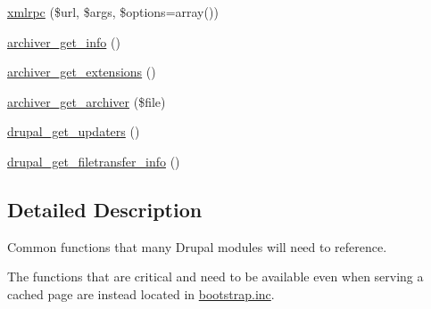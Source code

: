 \begin{DoxyCompactItemize}
\hyperlink{common_8inc_a66953a56d54712147cc383c1adb08dc3}{xmlrpc} (\$url, \$args, \$options=array())
\item 
\hyperlink{common_8inc_a15bb26df893f7c8919ab8e4505085028}{archiver\_\-get\_\-info} ()
\item 
\hyperlink{common_8inc_a18a577f5ca64b7ba483fc312e15d4d30}{archiver\_\-get\_\-extensions} ()
\item 
\hyperlink{common_8inc_af2f29710c2fe37e69be6501bf833361b}{archiver\_\-get\_\-archiver} (\$file)
\item 
\hyperlink{common_8inc_a0fa53aa7b4cdefaccb5283da37ad75df}{drupal\_\-get\_\-updaters} ()
\item 
\hyperlink{common_8inc_a9530d4fd3eee97770ebaaa5103d24bf4}{drupal\_\-get\_\-filetransfer\_\-info} ()
\end{DoxyCompactItemize}


\subsection{Detailed Description}
Common functions that many Drupal modules will need to reference.

The functions that are critical and need to be available even when serving a cached page are instead located in \hyperlink{bootstrap_8inc}{bootstrap.inc}. 

